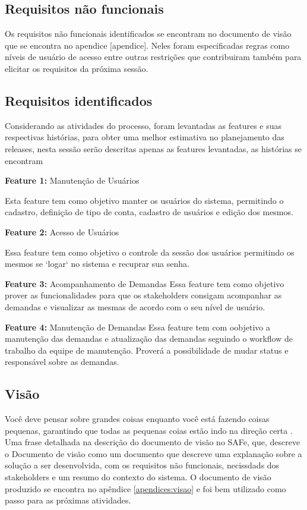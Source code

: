 \subsection{Requisitos não funcionais}

Os requisitos não funcionais identificados se encontram no documento de visão que se encontra no apendice
[apendice]. Neles foram especificadas regras como níveis de usuário de acesso entre outras restrições
que contribuiram também para elicitar os requisitos da próxima sessão.

\subsection{Requisitos identificados}

Considerando as atividades do processo, foram levantadas as features e suas
respectivas histórias, para obter uma melhor estimativa no planejamento das releases,
nesta sessão serão descritas apenas as features levantadas, as histórias se encontram

\textbf{Feature 1:} Manutenção de Usuários

Esta feature tem como objetivo manter os usuários do sistema, permitindo o cadastro,
definição de tipo de conta, cadastro de usuários e edição dos mesmos.

\textbf{Feature 2:} Acesso de Usuários

Essa feature tem como objetivo o controle da sessão dos usuários permitindo os
mesmos se `logar` no sistema e recuprar sua senha.


\textbf{Feature 3:} Acompanhamento de Demandas
Essa feature tem como objetivo prover as funcionalidades para
que os stakeholders consigam acompanhar as demandas e visualizar
as mesmas de acordo com o seu nível de usuário.


\textbf{Feature 4:} Manutenção de Demandas
Essa feature tem com oobjetivo a manutenção das demandas e atualização das
demandas seguindo o workflow de trabalho da equipe de manutenção. Proverá
a possibilidade de mudar status e responsável sobre as demandas.

\subsection{Visão}

Você deve pensar sobre grandes coisas enquanto você está fazendo coisas pequenas, garantindo que
todas as pequenas coias estão indo na direção certa
\cite{alvin}. Uma frase detalhada na descrição do documento de visão no SAFe,
que, descreve o Documento de visão como um documento que descreve uma explanação sobre a
solução a ser desenvolvida, com os requisitos não funcionais, necissdads dos stakeholders e
um resumo do contexto do sistema. O documento de visão produzido se encontra no apêndice \ref{apendices:visao}
e foi bem utilizado como passo para as próximas atividades.

